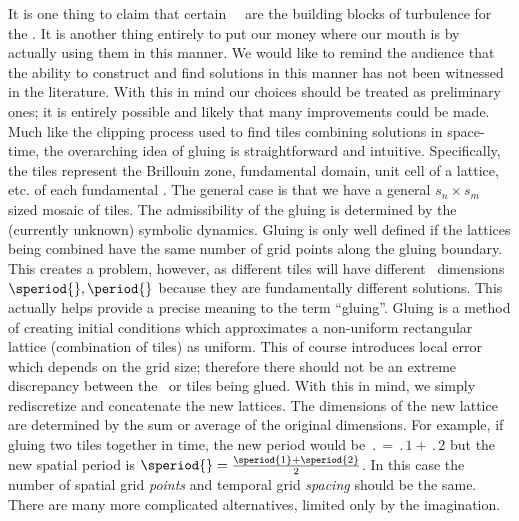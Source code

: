 It is one thing to claim that certain \spt\ \twots\ are the building blocks
of turbulence for the \KSe. It is
another thing entirely to put our money where our mouth is by actually using them in this manner. We would like to remind the audience that the ability to construct and find solutions in this manner
has not been witnessed in the literature. With this in mind our choices should
be treated as preliminary ones; it is entirely possible and likely that
many improvements could be made.
Much like the clipping process used to find tiles combining solutions in space-time,
the overarching idea of gluing is straightforward and intuitive.
Specifically, the tiles represent the
Brillouin zone, fundamental domain, unit cell of a lattice, etc.
of each fundamental \twot.
The general case is that we have a general $s_n \times s_m$ sized mosaic of tiles.
The admissibility of the gluing is determined by the (currently unknown) symbolic
dynamics. Gluing is only well defined if the lattices being combined have the same
number of grid points along the gluing boundary.
This creates a problem, however, as
different tiles will have different \spt\ dimensions $\speriod{},\period{}$ because
they are fundamentally different solutions.
This actually helps provide a precise meaning to the term ``gluing''.
Gluing is a method of creating initial conditions which approximates
a non-uniform rectangular lattice (combination of tiles) as uniform.
This of course introduces local error which depends on the grid size; therefore
there should not be an extreme discrepancy between the \twots\ or tiles being glued.
With this in mind, we simply rediscretize and concatenate the new lattices.
The dimensions of the new lattice are determined by the sum or average of
the original dimensions.
For example, if gluing two tiles together in time, the new period would be
$\period{} = \period{1} + \period{2}$ but the new spatial period is
$\speriod{} = \frac{\speriod{1} + \speriod{2}}{2}$.
In this case the number of spatial grid \emph{points} and temporal grid \emph{spacing}
should be the same. There are many more complicated alternatives, limited only by
the imagination.

